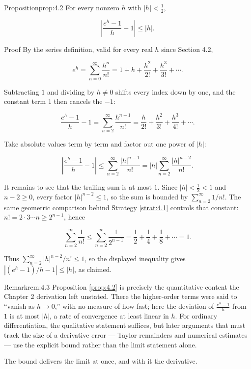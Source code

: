 \documentclass[a4paper,12pt,oneside]{memoir}
\begin{document}
\begin{envproposition}{Proposition}{prop:4.2}{}
For every nonzero \(h\) with \(\lvert h \rvert < \tfrac{1}{2}\),

\[ \left\lvert \frac{e^{h} - 1}{h} - 1 \right\rvert \le \lvert h \rvert. \]
\end{envproposition}
\begin{envproof}{Proof}{}{}
By the series definition, valid for every real \(h\) since Section 4.2,

\[ e^{h} = \sum_{n=0}^{\infty} \frac{h^{n}}{n!} = 1 + h + \frac{h^{2}}{2!} + \frac{h^{3}}{3!} + \cdots. \]

Subtracting \(1\) and dividing by \(h \ne 0\) shifts every index down by one, and the constant term \(1\) then cancels the \(-1\):

\[ \frac{e^{h} - 1}{h} - 1 = \sum_{n=2}^{\infty} \frac{h^{n - 1}}{n!} = \frac{h}{2!} + \frac{h^{2}}{3!} + \frac{h^{3}}{4!} + \cdots. \]

Take absolute values term by term and factor out one power of \(\lvert h \rvert\):

\[ \left\lvert \frac{e^{h} - 1}{h} - 1 \right\rvert \le \sum_{n=2}^{\infty} \frac{\lvert h \rvert^{n - 1}}{n!} = \lvert h \rvert \sum_{n=2}^{\infty} \frac{\lvert h \rvert^{n - 2}}{n!}. \]

It remains to see that the trailing sum is at most \(1\). Since \(\lvert h \rvert < \tfrac{1}{2} < 1\) and \(n - 2 \ge 0\), every factor \(\lvert h \rvert^{n - 2} \le 1\), so the sum is bounded by \(\sum_{n=2}^{\infty} 1/n!\). The same geometric comparison behind Strategy \ref{strat:4.1} controls that constant: \(n! = 2 \cdot 3 \cdots n \ge 2^{n - 1}\), hence

\[ \sum_{n=2}^{\infty} \frac{1}{n!} \le \sum_{n=2}^{\infty} \frac{1}{2^{n - 1}} = \frac{1}{2} + \frac{1}{4} + \frac{1}{8} + \cdots = 1. \]

Thus \(\sum_{n=2}^{\infty} \lvert h \rvert^{n - 2}/n! \le 1\), so the displayed inequality gives \(\left\lvert (e^{h} - 1)/h - 1 \right\rvert \le \lvert h \rvert\), as claimed. \qedmark
\end{envproof}
\begin{envremark}{Remark}{rem:4.3}{}
Proposition \ref{prop:4.2} is precisely the quantitative content the Chapter 2 derivation left unstated. There the higher-order terms were said to “vanish as \(h \to 0\),” with no measure of how fast; here the deviation of \(\frac{e^{h} - 1}{h}\) from \(1\) is at most \(\lvert h \rvert\), a rate of convergence at least linear in \(h\). For ordinary differentiation, the qualitative statement suffices, but later arguments that must track the size of a derivative error — Taylor remainders and numerical estimates — use the explicit bound rather than the limit statement alone.
\end{envremark}
The bound delivers the limit at once, and with it the derivative.
\end{document}
